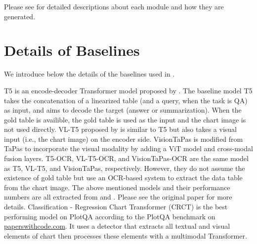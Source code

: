 Please see \citet{saxton2019analysing} for detailed descriptions about each module and how they are generated.


\section{Details of Baselines}\label{sec:baselines}
We introduce below the details of the baselines used in .

T5 is an encode-decoder Transformer model proposed by \citet{raffel2020exploring}. The baseline model T5 takes the concatenation of a linearized table (and a query, when the task is QA) as input, and aims to decode the target (answer or summarization). When the gold table is availible, the gold table is used as the input and the chart image is not used directly. VL-T5 proposed by \citet{cho2021unifying} is similar to T5 but also takes a visual input (i.e., the chart image) on the encoder side. VisionTaPas \citep{masry-etal-2022-chartqa} is modified from TaPas \citep{herzig-etal-2020-tapas} to incorporate the visual modality by adding a ViT model \citep{dosovitskiy2021image} and cross-modal fusion layers.
T5-OCR, VL-T5-OCR, and VisionTaPas-OCR are the same model as T5, VL-T5, and VisionTaPas, respectively. However, they do not assume the existence of gold table but use an OCR-based system to extract the data table from the chart image.
The above mentioned models and their performance numbers are all extracted from \citet{masry-etal-2022-chartqa} and \citet{kantharaj-etal-2022-chart}. Please see the original paper for more details.
Classification - Regression Chart Transformer (CRCT) \citep{levy2022classification} is the best performing model on PlotQA according to the PlotQA benchmark on \url{paperswithcode.com}. It uses a detector that extracts all textual and visual elements of chart then processes these elements with a multimodal Transformer.



